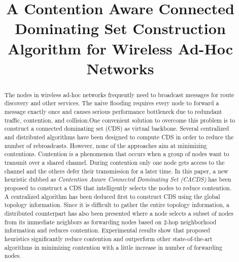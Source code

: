 \documentclass[conference]{IEEEtran}
\begin{document}
\DeclareRobustCommand*{\IEEEauthorrefmark}[1]{%
  \raisebox{0pt}[0pt][0pt]{\textsuperscript{\footnotesize\ensuremath{#1}}}}


\title{A Contention Aware Connected Dominating Set Construction Algorithm for Wireless Ad-Hoc Networks}


\author{
\and
{}
}


\maketitle

\begin{abstract}
The nodes in wireless ad-hoc networks frequently need to broadcast messages for route discovery and other services. The naive flooding requires every node to forward a message exactly once and causes serious performance bottleneck due to redundant traffic, contention, and collision.One convenient solution to overcome this problem is to construct a connected dominating set (CDS) as virtual backbone. Several centralized and distributed algorithms have been designed to compute CDS in order to reduce the number of rebroadcasts. However, none of the approaches aim at minimizing contentions. Contention is a phenomenon that occurs when a group of nodes want to transmit over a shared channel. During contention only one node gets access to the channel and the others defer their transmission for a later time. In this paper, a new heuristic dubbed as \emph{Contention Aware Connected Dominating Set (CACDS)} has been proposed to construct a CDS that intelligently selects the nodes to reduce contention. A centralized algorithm has been deduced first to construct CDS using the global topology information.
Since it is difficult to gather the entire topology information, a distributed counterpart has also been presented where a node selects a subset of nodes from its immediate neighbors as forwarding nodes based on 2-hop neighborhood information and reduces contention. Experimental results show that proposed heuristics significantly reduce contention and outperform other state-of-the-art algorithms in minimizing contention with a little increase in number of forwarding nodes. 
\end{abstract}
\end{document}
